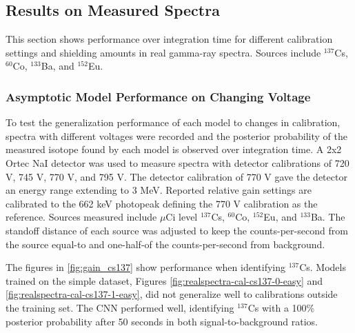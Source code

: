 


\subsection{Results on Measured Spectra}

This section shows performance over integration time for different calibration settings and shielding amounts in real gamma-ray spectra. Sources include $^{137}$Cs, $^{60}$Co, $^{133}$Ba, and $^{152}$Eu. 



\subsubsection{Asymptotic Model Performance on Changing Voltage}

To test the generalization performance of each model to changes in calibration, spectra with different voltages were recorded and the posterior probability of the measured isotope found by each model is observed over integration time. A 2x2 Ortec NaI detector was used to measure spectra with detector calibrations of 720 V, 745 V, 770 V, and 795 V. The detector calibration of 770 V gave the detector an energy range extending to 3 MeV. Reported relative gain settings are calibrated to the 662 keV photopeak defining the 770 V calibration as the reference. Sources measured include $\mu$Ci level $^{137}$Cs, $^{60}$Co, $^{152}$Eu, and $^{133}$Ba. The standoff distance of each source was adjusted to keep the counts-per-second from the source equal-to and one-half-of the counts-per-second from background.

The figures in \ref{fig:gain_cs137} show performance when identifying $^{137}$Cs. Models trained on the simple dataset, Figures \ref{fig:realspectra-cal-cs137-0-easy} and \ref{fig:realspectra-cal-cs137-1-easy}, did not generalize well to calibrations outside the training set. The CNN performed well, identifying $^{137}$Cs with a 100\% posterior probability after 50 seconds in both signal-to-background ratios.%

